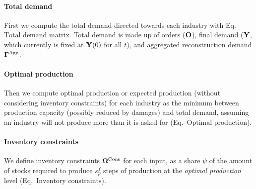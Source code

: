 \paragraph{Total demand}
\label{sec:total-demand}

First we compute the total demand directed towards each industry with
Eq.~\(\text{Total demand matrix}\). Total demand is made up of orders
($\mathbf{O}$), final demand ($\mathbf{Y}$, which currently is fixed at $\mathbf{Y}(0)$ for
all $t$), and aggregated reconstruction demand $\mathbf{\Gamma}^{\textrm{Agg}}$.

\paragraph{Optimal production}
\label{sec:optimal-production}

Then we compute optimal production or expected production (without considering
inventory constraints) for each industry as the minimum between production
capacity (possibly reduced by damages) and total demand, assuming an industry
will not produce more than it is asked for (Eq.~\(\text{Optimal production}\)).

\paragraph{Inventory constraints}
\label{sec:invent-constr}
We define inventory constraints \(\mathbf{\Omega}^{\textrm{Cons}}\) for each input, as a
share \(\psi\) of the amount of stocks required to produce \(s_p^f\) steps of
production at the \emph{optimal production} level (Eq.~\(\text{Inventory
  constraints}\)).

